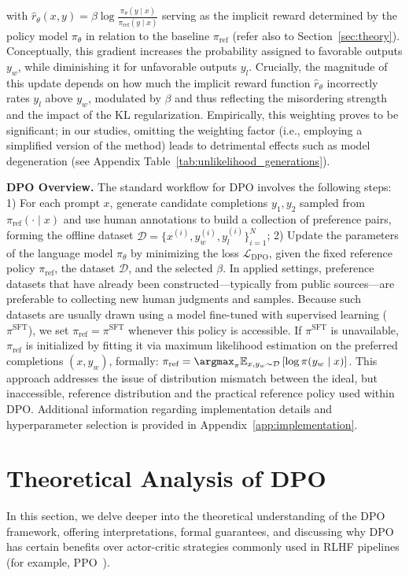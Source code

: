 with $\hat{r}_\theta(x, y) = \beta \log \frac{\pi_\theta(y \mid x)}{\pi_\text{ref}(y \mid x)}$ serving as the implicit reward determined by the policy model $\pi_\theta$ in relation to the baseline $\pi_\text{ref}$ (refer also to Section~\ref{sec:theory}). Conceptually, this gradient increases the probability assigned to favorable outputs $y_w$, while diminishing it for unfavorable outputs $y_l$. Crucially, the magnitude of this update depends on how much the implicit reward function $\hat{r}_\theta$ incorrectly rates $y_l$ above $y_w$, modulated by $\beta$ and thus reflecting the misordering strength and the impact of the KL regularization. Empirically, this weighting proves to be significant; in our studies, omitting the weighting factor (i.e., employing a simplified version of the method) leads to detrimental effects such as model degeneration (see Appendix Table~\ref{tab:unlikelihood_generations}).

\textbf{DPO Overview.} The standard workflow for DPO involves the following steps: 1) For each prompt $x$, generate candidate completions $y_1, y_2$ sampled from $\pi_\text{ref}(\cdot \mid x)$ and use human annotations to build a collection of preference pairs, forming the offline dataset $\mathcal{D} = \{x^{(i)}, y_w^{(i)}, y_l^{(i)}\}_{i=1}^N$; 2) Update the parameters of the language model $\pi_\theta$ by minimizing the loss $\mathcal{L}_\text{DPO}$, given the fixed reference policy $\pi_\text{ref}$, the dataset $\mathcal{D}$, and the selected $\beta$. 
In applied settings, preference datasets that have already been constructed—typically from public sources—are preferable to collecting new human judgments and samples. Because such datasets are usually drawn using a model fine-tuned with supervised learning ($\pi^\text{SFT}$), we set $\pi_\text{ref} = \pi^\text{SFT}$ whenever this policy is accessible. If $\pi^\text{SFT}$ is unavailable, $\pi_\text{ref}$ is initialized by fitting it via maximum likelihood estimation on the preferred completions ${(x, y_w)}$, formally: ${\pi_\text{ref} = \argmax_{\pi}\mathbb{E}_{x, y_w \sim \mathcal{D}}\left[\log \pi(y_w \mid x)\right]}$. This approach addresses the issue of distribution mismatch between the ideal, but inaccessible, reference distribution and the practical reference policy used within DPO. Additional information regarding implementation details and hyperparameter selection is provided in Appendix~\ref{app:implementation}.

\section{Theoretical Analysis of DPO} In this section, we delve deeper into the theoretical understanding of the DPO framework, offering interpretations, formal guarantees, and discussing why DPO has certain benefits over actor-critic strategies commonly used in RLHF pipelines (for example, PPO~\cite{schulman2017proximal}).

